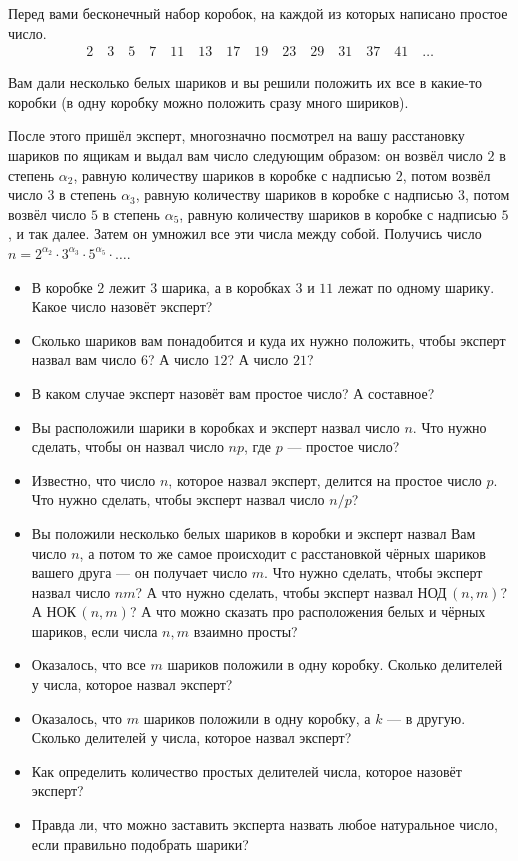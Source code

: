 
Перед вами бесконечный набор коробок, на каждой из которых написано простое число. 
\begin{align*}
2 \quad 3 \quad 5 \quad 7 \quad 11 \quad 13 \quad 17 \quad 19 \quad 23 \quad 29 \quad 31 \quad 37 \quad 41 \quad \ldots
\end{align*}

Вам дали несколько белых шариков и вы решили положить их все в какие-то коробки (в одну коробку можно положить сразу много шириков). \medskip

После этого пришёл эксперт, многозначно посмотрел на вашу расстановку шариков по ящикам и выдал вам число следующим образом: он возвёл число $2$ в степень $\alpha_2$, равную количеству шариков в коробке с надписью $2$, потом возвёл число $3$ в степень $\alpha_3$, равную количеству шариков в коробке с надписью $3$, потом возвёл число $5$ в степень $\alpha_5$, равную количеству шариков в коробке с надписью $5$, и так далее. Затем он умножил все эти числа между собой. Получись число $n = 2^{\alpha_2}\cdot 3^{\alpha_3}\cdot 5^{\alpha_5}\cdot \ldots$.

\begin{itemize}
\item В коробке $2$ лежит $3$ шарика, а в коробках $3$ и $11$ лежат по одному шарику. Какое число назовёт эксперт?
\item Сколько шариков вам понадобится и куда их нужно положить, чтобы эксперт назвал вам число $6$? А число $12$? А число $21$?
\item В каком случае эксперт назовёт вам простое число? А составное? 
\item Вы расположили шарики в коробках и эксперт назвал число $n$. Что нужно сделать, чтобы он назвал число $np$, где $p$ --- простое число?
\item Известно, что число $n$, которое назвал эксперт, делится на простое число $p$. Что нужно сделать, чтобы эксперт назвал число $n/p$?
\item Вы положили несколько белых шариков в коробки и эксперт назвал Вам число $n$, а потом то же самое происходит с расстановкой чёрных шариков вашего друга --- он получает число $m$. Что нужно сделать, чтобы эксперт назвал число $nm$? А что нужно сделать, чтобы эксперт назвал НОД\,$(n,m)$? А НОК\,$(n,m)$? А что можно сказать про расположения белых и чёрных шариков, если числа $n,m$ взаимно просты?
\item Оказалось, что все $m$ шариков положили в одну коробку. Сколько делителей у числа, которое назвал эксперт?
\item Оказалось, что $m$ шариков положили в одну коробку, а $k$ --- в другую. Сколько делителей у числа, которое назвал эксперт?
\item Как определить количество простых делителей числа, которое назовёт эксперт?
\item Правда ли, что можно заставить эксперта назвать любое натуральное число, если правильно подобрать шарики?

\end{itemize}